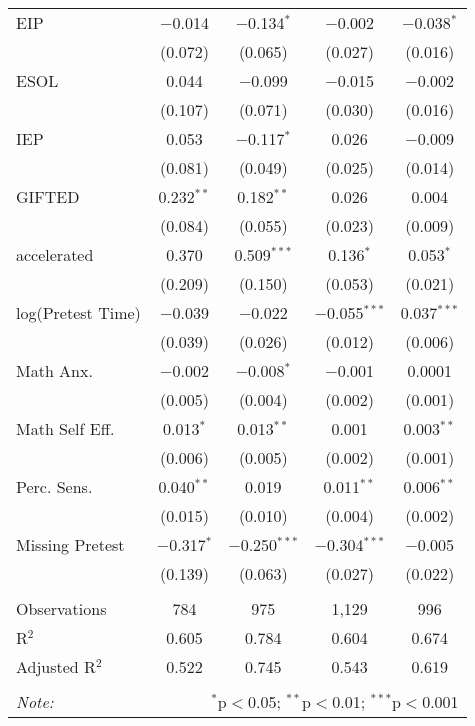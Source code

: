 \begin{table}[!htbp]
\begin{tabular}{@{\extracolsep{5pt}}lcccc}
 EIP & $-$0.014 & $-$0.134$^{*}$ & $-$0.002 & $-$0.038$^{*}$ \\ 
  & (0.072) & (0.065) & (0.027) & (0.016) \\ 
 ESOL & 0.044 & $-$0.099 & $-$0.015 & $-$0.002 \\ 
  & (0.107) & (0.071) & (0.030) & (0.016) \\ 
 IEP & 0.053 & $-$0.117$^{*}$ & 0.026 & $-$0.009 \\ 
  & (0.081) & (0.049) & (0.025) & (0.014) \\ 
 GIFTED & 0.232$^{**}$ & 0.182$^{**}$ & 0.026 & 0.004 \\ 
  & (0.084) & (0.055) & (0.023) & (0.009) \\ 
 accelerated & 0.370 & 0.509$^{***}$ & 0.136$^{*}$ & 0.053$^{*}$ \\ 
  & (0.209) & (0.150) & (0.053) & (0.021) \\ 
 log(Pretest Time) & $-$0.039 & $-$0.022 & $-$0.055$^{***}$ & 0.037$^{***}$ \\ 
  & (0.039) & (0.026) & (0.012) & (0.006) \\ 
 Math Anx. & $-$0.002 & $-$0.008$^{*}$ & $-$0.001 & 0.0001 \\ 
  & (0.005) & (0.004) & (0.002) & (0.001) \\ 
Math Self Eff. & 0.013$^{*}$ & 0.013$^{**}$ & 0.001 & 0.003$^{**}$ \\ 
  & (0.006) & (0.005) & (0.002) & (0.001) \\ 
 Perc. Sens. & 0.040$^{**}$ & 0.019 & 0.011$^{**}$ & 0.006$^{**}$ \\ 
  & (0.015) & (0.010) & (0.004) & (0.002) \\ 
 Missing Pretest & $-$0.317$^{*}$ & $-$0.250$^{***}$ & $-$0.304$^{***}$ & $-$0.005 \\ 
  & (0.139) & (0.063) & (0.027) & (0.022) \\ 
\hline \\[-1.8ex] 
Observations & 784 & 975 & 1,129 & 996 \\ 
R$^{2}$ & 0.605 & 0.784 & 0.604 & 0.674 \\ 
Adjusted R$^{2}$ & 0.522 & 0.745 & 0.543 & 0.619 \\ 
\hline 
\hline \\[-1.8ex] 
\textit{Note:}  & \multicolumn{4}{r}{$^{*}$p$<$0.05; $^{**}$p$<$0.01; $^{***}$p$<$0.001} \\ 
\end{tabular} 
\end{table} 

